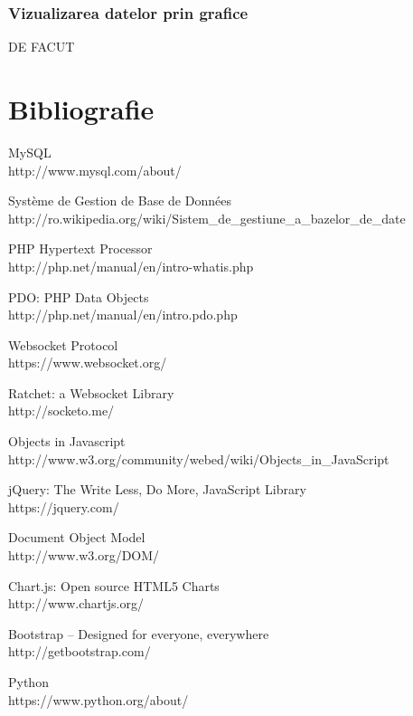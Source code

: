 \documentclass[12pt,a4paper]{article}
\begin{document}
\subsubsection{Vizualizarea datelor prin grafice}
DE FACUT
\newpage
\section{Bibliografie}
\begingroup
\renewcommand{\section}[2]{}%
\begin{thebibliography}{99}

	MySQL \\
	http://www.mysql.com/about/
	
	Système de Gestion de Base de Données\\
	http://ro.wikipedia.org/wiki/Sistem\_de\_gestiune\_a\_bazelor\_de\_date

	PHP Hypertext Processor\\
	http://php.net/manual/en/intro-whatis.php

	PDO: PHP Data Objects\\
	http://php.net/manual/en/intro.pdo.php
	
	Websocket Protocol\\
	https://www.websocket.org/
	
	Ratchet: a Websocket Library\\
	http://socketo.me/
	
	Objects in Javascript\\
	http://www.w3.org/community/webed/wiki/Objects\_in\_JavaScript
	
	jQuery: The Write Less, Do More, JavaScript Library\\
	https://jquery.com/
	
	Document Object Model\\
	http://www.w3.org/DOM/

	Chart.js: Open source HTML5 Charts \\
	http://www.chartjs.org/
	
	Bootstrap -- Designed for everyone, everywhere \\
	http://getbootstrap.com/
	
	Python \\
	https://www.python.org/about/


\end{thebibliography}
\end{document}
